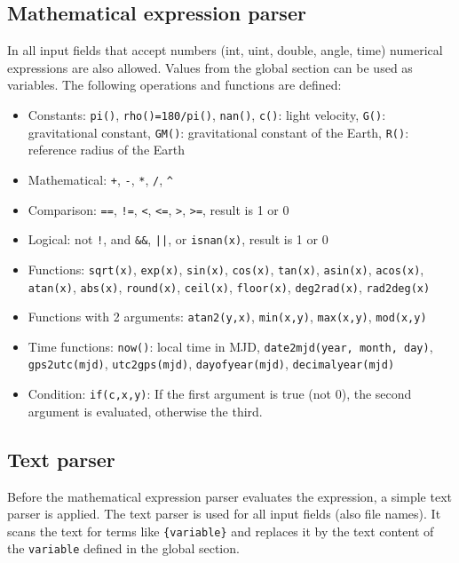 
\subsection{Mathematical expression parser}\label{general.parser:expression}
In all input fields that accept numbers (int, uint, double, angle, time) numerical
expressions are also allowed. Values from the global section can be used as variables. The following
operations and functions are defined:
\begin{itemize}
\item Constants:    \verb|pi()|, \verb|rho()=180/pi()|, \verb|nan()|, \verb|c()|: light velocity,
                    \verb|G()|: gravitational constant, \verb|GM()|: gravitational constant of the Earth, \verb|R()|: reference radius of the Earth
\item Mathematical: \verb|+|, \verb|-|, \verb|*|, \verb|/|, \verb|^|
\item Comparison:   \verb|==|, \verb|!=|, \verb|<|, \verb|<=|, \verb|>|, \verb|>=|, result is 1 or 0
\item Logical:      not \verb|!|, and \verb|&&|, \verb'||', or \verb|isnan(x)|, result is 1 or 0
\item Functions:    \verb|sqrt(x)|, \verb|exp(x)|,
                    \verb|sin(x)|,  \verb|cos(x)|, \verb|tan(x)|,
                    \verb|asin(x)|,  \verb|acos(x)|,  \verb|atan(x)|,
                    \verb|abs(x)|,  \verb|round(x)|,  \verb|ceil(x)|,  \verb|floor(x)|,
                    \verb|deg2rad(x)|, \verb|rad2deg(x)|
\item Functions with 2 arguments: \verb|atan2(y,x)|, \verb|min(x,y)|, \verb|max(x,y)|, \verb|mod(x,y)|
\item Time functions: \verb|now()|: local time in MJD, \verb|date2mjd(year, month, day)|, \verb|gps2utc(mjd)|, \verb|utc2gps(mjd)|, \verb|dayofyear(mjd)|, \verb|decimalyear(mjd)|
\item Condition: \verb|if(c,x,y)|: If the first argument is true (not 0), the second argument is evaluated, otherwise the third.
\end{itemize}


\subsection{Text parser}\label{general.parser:text}
Before the mathematical expression parser evaluates the expression, a simple text parser is applied.
The text parser is used for all input fields (also file names). It scans the text for terms like
\verb|{variable}| and replaces it by the text content of the \verb|variable| defined in the global section.

